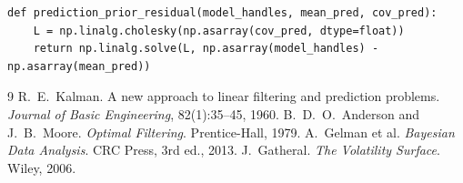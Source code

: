 \documentclass[11pt]{article}
\begin{document}
\begin{lstlisting}[caption={Whitened residual rows for the active MAP
prediction prior (distilled from
\texttt{calib/observation\_filter.py}; production escalates a reported
jitter --- a diagnostic event, never a silent repair).}]
def prediction_prior_residual(model_handles, mean_pred, cov_pred):
    L = np.linalg.cholesky(np.asarray(cov_pred, dtype=float))
    return np.linalg.solve(L, np.asarray(model_handles) - np.asarray(mean_pred))
\end{lstlisting}

\begin{thebibliography}{9}
 R.~E.~Kalman. A new approach to linear filtering
and prediction problems. \emph{Journal of Basic Engineering},
82(1):35--45, 1960.
 B.~D.~O.~Anderson and J.~B.~Moore.
\emph{Optimal Filtering}. Prentice-Hall, 1979.
 A.~Gelman et al. \emph{Bayesian Data Analysis}.
CRC Press, 3rd ed., 2013.
 J.~Gatheral. \emph{The Volatility Surface}.
Wiley, 2006.
\end{thebibliography}
\end{document}

